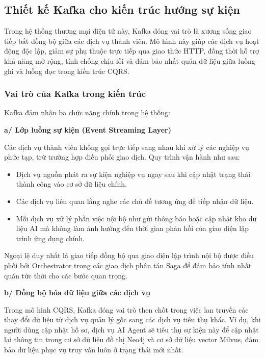 \subsection{Thiết kế Kafka cho kiến trúc hướng sự kiện}

Trong hệ thống thương mại điện tử này, Kafka đóng vai trò là xương sống giao tiếp bất đồng bộ giữa các dịch vụ thành viên. Mô hình này giúp các dịch vụ hoạt động độc lập, giảm sự phụ thuộc trực tiếp qua giao thức HTTP, đồng thời hỗ trợ khả năng mở rộng, tính chống chịu lỗi và đảm bảo nhất quán dữ liệu giữa luồng ghi và luồng đọc trong kiến trúc CQRS.

\subsubsection{Vai trò của Kafka trong kiến trúc}

Kafka đảm nhận ba chức năng chính trong hệ thống:

\textbf{a/ Lớp luồng sự kiện (Event Streaming Layer)}

Các dịch vụ thành viên không gọi trực tiếp sang nhau khi xử lý các nghiệp vụ phức tạp, trừ trường hợp điều phối giao dịch. Quy trình vận hành như sau:
\begin{itemize}
    \item Dịch vụ nguồn phát ra sự kiện nghiệp vụ ngay sau khi cập nhật trạng thái thành công vào cơ sở dữ liệu chính.
    \item Các dịch vụ liên quan lắng nghe các chủ đề tương ứng để tiếp nhận dữ liệu.
    \item Mỗi dịch vụ xử lý phần việc nội bộ như gửi thông báo hoặc cập nhật kho dữ liệu AI mà không làm ảnh hưởng đến thời gian phản hồi của giao diện lập trình ứng dụng chính.
\end{itemize}

Ngoại lệ duy nhất là giao tiếp đồng bộ qua giao diện lập trình nội bộ được điều phối bởi Orchestrator trong các giao dịch phân tán Saga để đảm bảo tính nhất quán tức thời cho các bước quan trọng.

\textbf{b/ Đồng bộ hóa dữ liệu giữa các dịch vụ}

Trong mô hình CQRS, Kafka đóng vai trò then chốt trong việc lan truyền các thay đổi dữ liệu từ dịch vụ quản lý gốc sang các dịch vụ tiêu thụ khác. Ví dụ, khi người dùng cập nhật hồ sơ, dịch vụ AI Agent sẽ tiêu thụ sự kiện này để cập nhật lại thông tin trong cơ sở dữ liệu đồ thị Neo4j và cơ sở dữ liệu vector Milvus, đảm bảo dữ liệu phục vụ truy vấn luôn ở trạng thái mới nhất.

